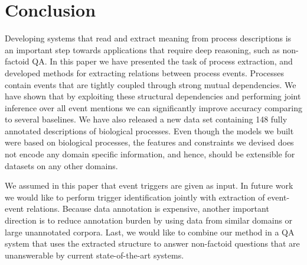 \section{Conclusion}

Developing systems that read and extract meaning from process descriptions is an important step towards applications that require deep reasoning, such as non-factoid QA. In this paper we have presented the task of process extraction, and developed methods for extracting relations between process events. Processes contain events that are  tightly coupled through strong mutual dependencies. We have shown that by exploiting these structural dependencies and performing joint inference over all event mentions we can significantly improve accuracy comparing to several baselines. We have also released a new data set containing 148 fully annotated descriptions of biological processes. Even though the models we built were based on biological processes, the features and constraints we devised does not encode any domain specific information, and hence, should be extensible for datasets on any other domains.

We assumed in this paper that event triggers are given as input. In future work we would like to perform trigger identification jointly with extraction of event-event relations. Because data annotation is expensive, another important direction is to reduce annotation burden by using data from similar domains or large unannotated corpora. Last, we would like to combine our method in a QA system that uses the extracted structure to answer non-factoid questions that are unanswerable by current state-of-the-art systems.
